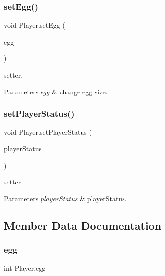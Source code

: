 \subsubsection{\texorpdfstring{set\+Egg()}{setEgg()}}
{\footnotesize\ttfamily void Player.\+set\+Egg (\begin{DoxyParamCaption}\item[{int}]{egg }\end{DoxyParamCaption})\hspace{0.3cm}{\ttfamily [inline]}}

setter. 
\begin{DoxyParams}{Parameters}
{\em egg} & change egg size. \\
\hline
\end{DoxyParams}
\mbox{\label{class_player_ac740d3458e2caf24efcdb95198c2a388}} 
\subsubsection{\texorpdfstring{set\+Player\+Status()}{setPlayerStatus()}}
{\footnotesize\ttfamily void Player.\+set\+Player\+Status (\begin{DoxyParamCaption}\item[{\mbox{\hyperlink{enum_player_1_1_player_status}{Player\+Status}}}]{player\+Status }\end{DoxyParamCaption})\hspace{0.3cm}{\ttfamily [inline]}}

setter. 
\begin{DoxyParams}{Parameters}
{\em player\+Status} & player\+Status. \\
\hline
\end{DoxyParams}


\subsection{Member Data Documentation}
\mbox{\label{class_player_a9ed64c22212ad7526eca0903a05f9967}} 
\subsubsection{\texorpdfstring{egg}{egg}}
{\footnotesize\ttfamily int Player.\+egg\hspace{0.3cm}{\ttfamily [private]}}

